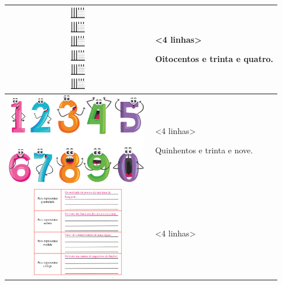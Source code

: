 \begin{longtable}[]{@{}ll@{}}
\toprule
\begin{minipage}[b]{0.48\columnwidth}\raggedright\strut
\includegraphics[width=2.46062in,height=1.44792in]{media/image7.png}\strut
\end{minipage} & \begin{minipage}[b]{0.48\columnwidth}\raggedright\strut
\textless{}4 linhas\textgreater{}

Oitocentos e trinta e quatro.\strut
\end{minipage}\tabularnewline
\midrule
\endhead
\begin{minipage}[t]{0.48\columnwidth}\raggedright\strut
\includegraphics[width=2.40625in,height=1.57296in]{media/image8.png}\strut
\end{minipage} & \begin{minipage}[t]{0.48\columnwidth}\raggedright\strut
\textless{}4 linhas\textgreater{}

Quinhentos e trinta e nove.\strut
\end{minipage}\tabularnewline
\begin{minipage}[t]{0.48\columnwidth}\raggedright\strut
\includegraphics[width=2.45833in,height=1.52742in]{media/image9.png}\strut
\end{minipage} & \begin{minipage}[t]{0.48\columnwidth}\raggedright\strut
\textless{}4 linhas\textgreater{}


\end{minipage}
\end{longtable}
